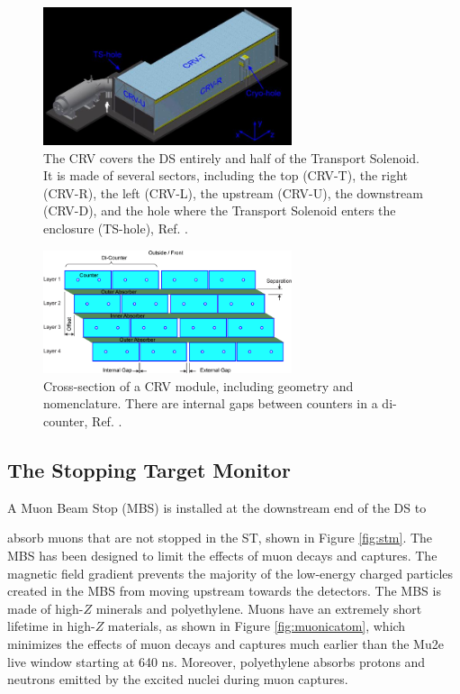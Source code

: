 \begin{figure}[!h]
\centering
\includegraphics[width =0.65\textwidth]{figures/jpg/Crv_downstream.jpg}
\caption[The CRV features and components.]{The CRV covers the DS entirely and half 
of the Transport Solenoid. It is made of several sectors, including the top 
(CRV-T), the right (CRV-R), the left (CRV-L), the upstream (CRV-U), the downstream 
(CRV-D), and the hole where the Transport Solenoid enters the enclosure (TS-hole), Ref. \cite{bartoszek2015mu2e}.}
\label{fig:crv}
\end{figure}

\begin{figure}[!h]
\centering
\includegraphics[width =0.65\textwidth]{figures/png/Crv_module_geometry.png}
\caption[The cross-section of a CRV module.]{Cross-section of a CRV module, including geometry and nomenclature. 
There are internal gaps between counters in a di-counter, Ref. \cite{Giovannella_2020}.}
\label{fig:crvmodule}
\end{figure}
\subsection{The Stopping Target Monitor}
{\red A Muon Beam Stop (MBS)} is installed at the downstream end of the DS to

absorb muons that are not stopped in the ST, shown in Figure \ref{fig:stm}. 
The MBS has been designed to limit the effects of muon decays and captures. 
The magnetic field gradient prevents the majority of the low-energy charged 
particles created in the MBS from moving upstream towards the detectors.  
The MBS is made of high-$Z$ minerals and polyethylene. Muons have an extremely short lifetime in 
high-$Z$ materials, as shown in Figure \ref{fig:muonicatom}, which minimizes the effects of muon 
decays and captures much earlier than the Mu2e live window starting at 640 ns. Moreover, polyethylene 
absorbs protons and neutrons emitted by the excited nuclei during muon captures.  

